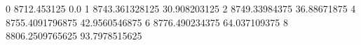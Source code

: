 0 8712.453125 0.0
1 8743.361328125 30.908203125
2 8749.33984375 36.88671875
4 8755.4091796875 42.9560546875
6 8776.490234375 64.037109375
8 8806.2509765625 93.7978515625
